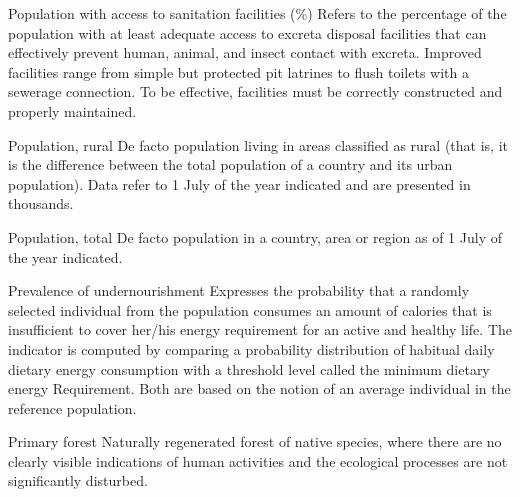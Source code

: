 \begin{MetadataCollection} {}
\begin{metadata}{Population with access to sanitation facilities (\%)} {}
Refers to the percentage of the population with at least adequate access to excreta disposal facilities that can effectively prevent human, animal, and insect contact with excreta. Improved facilities range from simple but protected pit latrines to flush toilets with a sewerage connection. To be effective, facilities must be correctly constructed and properly maintained.
\end{metadata}

\begin{metadata}{Population, rural} {}
De facto population living in areas classified as rural (that is, it is the difference between the total population of a country and its urban population). Data refer to 1 July of the year indicated and are presented in thousands.
\end{metadata}

\begin{metadata}{Population, total} {}
De facto population in a country, area or region as of 1 July of the year indicated.
\end{metadata}

\begin{metadata}{Prevalence of undernourishment} {}
Expresses the probability that a randomly selected individual from the population consumes an amount of calories that is insufficient to cover her/his energy requirement for an active and healthy life. The indicator is computed by comparing a probability distribution of habitual daily dietary energy consumption with a threshold level called the minimum dietary energy Requirement. Both are based on the notion of an average individual in the reference population.
\end{metadata}

\begin{metadata}{Primary forest} {}
Naturally regenerated forest of native species, where there are no clearly visible indications of human activities and the ecological processes are not significantly disturbed.
\end{metadata}


\end{MetadataCollection}

